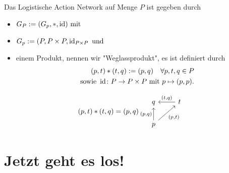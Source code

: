 \documentclass{article}
\begin{document}
	\begin{definition}
		Das Logistische Action Network auf Menge $P$ ist gegeben durch
		\begin{itemize}
			\item $G_P := (G_p, \ast, \operatorname{id}) \text{ mit }$
			\item $G_p := (P, P\times P, \operatorname{id}_{P\times P}\text{ und }$
			\item einem Produkt, nennen wir "Weglassprodukt", es ist definiert durch
			\begin{align*}
			(p,t)\ast (t,q) := (p,q) \quad \forall p,t,q \in P\\
			\text{sowie } \operatorname{id} \colon P \to P \times P \text{ mit } p \mapsto (p,p).
			\end{align*}
		\end{itemize}
	\end{definition}
\begin{align*}
	(p,t)\ast (t,q) = (p,q)
		\begin{tikzcd}[ampersand replacement=\&]
			q                                             \& t \arrow[l, "{(t,q)}"'] \\
			p \arrow[u, "{(p,q)}"] \arrow[ru, "{(p,t)}"'] \&      
		\end{tikzcd}
\end{align*}
	
	
	\section{Jetzt geht es los!}
	
\end{document}
